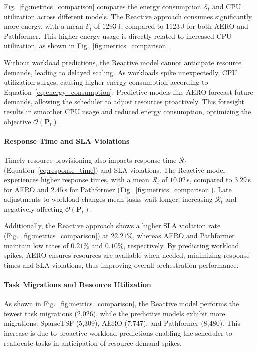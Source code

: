 \documentclass{ieeetmlcn}
\begin{document}
Fig.~\ref{fig:metrics_comparison} compares the energy consumption $\mathcal{E}_t$ and CPU utilization across different models. The Reactive approach consumes significantly more energy, with a mean $\mathcal{E}_t$ of $1293$\,J, compared to $1123$\,J for both AERO and Pathformer. This higher energy usage is directly related to increased CPU utilization, as shown in Fig.~\ref{fig:metrics_comparison}.

Without workload predictions, the Reactive model cannot anticipate resource demands, leading to delayed scaling. As workloads spike unexpectedly, CPU utilization surges, causing higher energy consumption according to Equation~\eqref{eq:energy_consumption}. Predictive models like AERO forecast future demands, allowing the scheduler to adjust resources proactively. This foresight results in smoother CPU usage and reduced energy consumption, optimizing the objective $\mathcal{O}(\mathbf{P}_t)$.

\paragraph*{Response Time and SLA Violations}

Timely resource provisioning also impacts response time $\mathcal{R}_t$ (Equation~\eqref{eq:response_time}) and SLA violations. The Reactive model experiences higher response times, with a mean $\mathcal{R}_t$ of $10.02$\,s, compared to $3.29$\,s for AERO and $2.45$\,s for Pathformer (Fig.~\ref{fig:metrics_comparison}). Late adjustments to workload changes mean tasks wait longer, increasing $\mathcal{R}_t$ and negatively affecting $\mathcal{O}(\mathbf{P}_t)$.

Additionally, the Reactive approach shows a higher SLA violation rate (Fig.~\ref{fig:metrics_comparison}) at $22.21\%$, whereas AERO and Pathformer maintain low rates of $0.21\%$ and $0.10\%$, respectively. By predicting workload spikes, AERO ensures resources are available when needed, minimizing response times and SLA violations, thus improving overall orchestration performance.

\paragraph*{Task Migrations and Resource Utilization}

As shown in Fig.~\ref{fig:metrics_comparison}, the Reactive model performs the fewest task migrations (2,026), while the predictive models exhibit more migrations: SparseTSF (5,309), AERO (7,747), and Pathformer (8,480). This increase is due to proactive workload predictions enabling the scheduler to reallocate tasks in anticipation of resource demand spikes.
\end{document}
